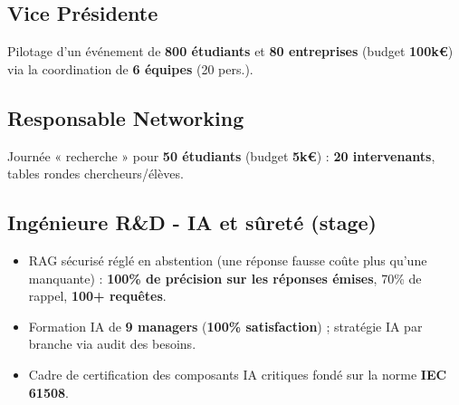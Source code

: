 \documentclass{assets/template/cvclass}
\def\spaceSections{0.13cm}
\begin{document}
\begin{area-right}
    \subsection{Vice Présidente}
      Pilotage d'un événement de \textbf{800 étudiants} et \textbf{80 entreprises} (budget \textbf{100k€}) via la coordination de \textbf{6 équipes} (20 pers.).
      \vspace{\spaceSections} 

    \subsection{Responsable Networking}
      Journée « recherche » pour \textbf{50 étudiants} (budget \textbf{5k€}) : \textbf{20 intervenants}, tables rondes chercheurs/élèves.
          \vspace{\spaceSections}

    \subsection{Ingénieure R\&D - IA et sûreté (stage)}
      \begin{itemize}
        \item RAG sécurisé réglé en abstention (une réponse fausse coûte plus qu'une manquante) : \textbf{100\% de précision sur les réponses émises}, 70\% de rappel, \textbf{100+ requêtes}.
        \item Formation IA de \textbf{9 managers} (\textbf{100\% satisfaction}) ; stratégie IA par branche via audit des besoins.
        \item Cadre de certification des composants IA critiques fondé sur la norme \textbf{IEC 61508}.
      \end{itemize}
    \vspace{\spaceSections}


\end{area-right}
\end{document}
